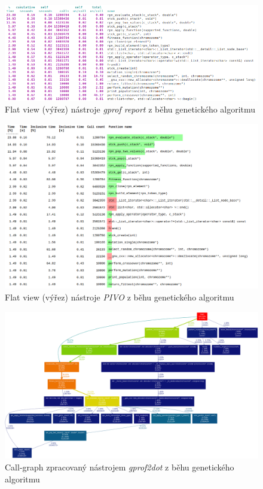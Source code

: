 \documentclass[czech,BP]{thesiskiv}
\begin{document}
\newpage
\vspace*{1cm} %

\begin{figure}[h]
    \centering
    \includegraphics[interpolate,width=1.0\textwidth]{img/test-ga-orig-flat.png}
    \caption{Flat view (výřez) nástroje \emph{gprof report} z běhu genetického algoritmu}
    \label{obr:testgprofreportflat}
\end{figure}
\vfill
\begin{figure}[h]
    \centering
    \includegraphics[interpolate,width=1.0\textwidth]{img/test-ga-pivo-flat.png}
    \caption{Flat view (výřez) nástroje \emph{PIVO} z běhu genetického algoritmu}
    \label{obr:testgprofpivoflat}
\end{figure}
\vfill

\begin{figure}
    \centering
    \includegraphics[interpolate,width=1.0\textwidth]{img/test-ga-gprof2dot-graph.png}
    \caption{Call-graph zpracovaný nástrojem \emph{gprof2dot} z běhu genetického algoritmu}
    \label{obr:testgprof2dot}
\end{figure}
\end{document}
